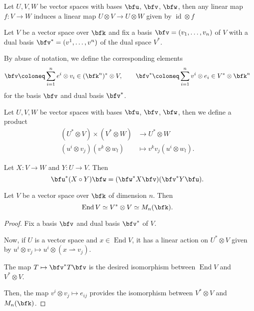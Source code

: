 \documentclass{article}
\DeclareMathOperator{\End}{End}
\DeclareMathOperator{\id}{id}
\begin{document}
\begin{definition}
    Let $U, V, W$ be vector spaces with bases $\bfu$, $\bfv$, $\bfw$, then any linear map $f: V \to W$ induces a linear map $U \otimes V \to U \otimes W$ given by $\id \otimes f$
\end{definition}

\begin{definition}
    Let $V$ be a vector space over $\bfk$ and fix a basis $\bfv = (v_1,\ldots,v_n)$ of $V$ with a dual basis $\bfv^\ast = (v^1, \ldots, v^n)$ of the dual space $V^\ast$.

    By abuse of notation, we define the corresponding elements
    \[
        \bfv 
        \coloneq 
        \sum_{i=1}^n 
        e^i \otimes v_i 
        \in (\bfk^n)^\ast \otimes V
        ,\qquad
        \bfv^\ast 
        \coloneq 
        \sum_{i=1}^n v^i \otimes e_i 
        \in V^\ast \otimes \bfk^n
    \]
    for the basis $\bfv$ and dual basis $\bfv^\ast$.
\end{definition}

\begin{definition}
    Let $U, V, W$ be vector spaces with bases $\bfu$, $\bfv$, $\bfw$, then we define a product
    \begin{align*}
        (U^\ast \otimes V) \times (V^\ast \otimes W)
        &\to
        U^\ast \otimes W
        \\
        (u^i \otimes v_j)(v^k \otimes w_l)
        &\mapsto
        v^kv_j
        (u^i \otimes w_l).
    \end{align*}
\end{definition}

\begin{theorem}
    Let $X: V \to W$ and $Y: U \to V$.
    Then 
    \[
        \bfu^\ast(X \circ Y)\bfw
        =
        (\bfw^\ast X \bfv)(\bfv^\ast Y \bfu).
    \]
\end{theorem}

\begin{theorem}
    Let $V$ be a vector space over $\bfk$ of dimension $n$.
    Then
    \[
        \End V
        \simeq
        V^\ast \otimes V
        \simeq
        M_n(\bfk).
    \]
\end{theorem}

\begin{proof}
    Fix a basis $\bfv$ and dual basis $\bfv^\ast$ of $V$.

    Now, if $U$ is a vector space and $x \in \End V$, it has a linear action on $U^\ast \otimes V$ given by $u^i \otimes v_j \mapsto u^i \otimes (x \rightharpoonup v_j)$.

    The map $T \mapsto \bfv^\ast T \bfv$ is the desired isomorphism between $\End V$ and $V^\ast \otimes V$.

    Then, the map $v^i \otimes v_j \mapsto e_{ij}$ provides the isomorphism between $V^\ast \otimes V$ and $M_n(\bfk)$.
\end{proof}
\end{document}
